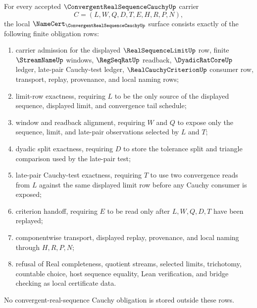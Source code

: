 \begin{theorem}\label{thm:convergent-real-sequence-cauchy-namecert-obligations}
For every accepted $\ConvergentRealSequenceCauchyUp$ carrier
$$
C=(L,W,Q,D,T,E,H,R,P,N),
$$
the local $\NameCert_{\ConvergentRealSequenceCauchyUp}$ surface consists exactly of the following finite obligation rows:
\begin{enumerate}
\item carrier admission for the displayed $\RealSequenceLimitUp$ row, finite $\StreamNameUp$ windows, $\RegSeqRatUp$ readback, $\DyadicRatCoreUp$ ledger, late-pair Cauchy-test ledger, $\RealCauchyCriterionUp$ consumer row, transport, replay, provenance, and local naming rows;
\item limit-row exactness, requiring $L$ to be the only source of the displayed sequence, displayed limit, and convergence tail schedule;
\item window and readback alignment, requiring $W$ and $Q$ to expose only the sequence, limit, and late-pair observations selected by $L$ and $T$;
\item dyadic split exactness, requiring $D$ to store the tolerance split and triangle comparison used by the late-pair test;
\item late-pair Cauchy-test exactness, requiring $T$ to use two convergence reads from $L$ against the same displayed limit row before any Cauchy consumer is exposed;
\item criterion handoff, requiring $E$ to be read only after $L,W,Q,D,T$ have been replayed;
\item componentwise transport, displayed replay, provenance, and local naming through $H,R,P,N$;
\item refusal of Real completeness, quotient streams, selected limits, trichotomy, countable choice, host sequence equality, Lean verification, and bridge checking as local certificate data.
\end{enumerate}
No convergent-real-sequence Cauchy obligation is stored outside these rows.
\end{theorem}
